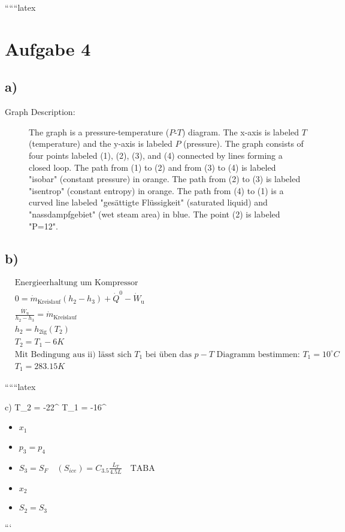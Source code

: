 
``````latex


\section*{Aufgabe 4}

\subsection*{a)}

\begin{description}
    \item[Graph Description:] The graph is a pressure-temperature ($P$-$T$) diagram. The x-axis is labeled $T$ (temperature) and the y-axis is labeled $P$ (pressure). The graph consists of four points labeled (1), (2), (3), and (4) connected by lines forming a closed loop. The path from (1) to (2) and from (3) to (4) is labeled "isobar" (constant pressure) in orange. The path from (2) to (3) is labeled "isentrop" (constant entropy) in orange. The path from (4) to (1) is a curved line labeled "gesättigte Flüssigkeit" (saturated liquid) and "nassdampfgebiet" (wet steam area) in blue. The point (2) is labeled "P=12".
\end{description}

\subsection*{b)}

\begin{align*}
    &\text{Energieerhaltung um Kompressor} \\
    &0 = \dot{m}_{\text{Kreislauf}} (h_2 - h_3) + \dot{Q}^0 - \dot{W}_{\text{u}} \\
    &\frac{\dot{W}_{\text{u}}}{h_2 - h_3} = \dot{m}_{\text{Kreislauf}} \\
    &h_2 = h_{\text{2ig}}(T_2) \\
    &T_2 = T_1 - 6K \\
    &\text{Mit Bedingung aus ii) lässt sich } T_1 \text{ bei üben das } p-T \text{ Diagramm bestimmen: } T_1 = 10^\circ C \\
    &T_1 = 283.15 K
\end{align*}

``````latex


c) \quad T_2 = -22^\circ {} \quad \quad T_1 = -16^\circ {}

\begin{itemize}
    \item $x_1$
    \item $p_3 = p_4$
    \item $S_3 = S_F \quad (S_{ice}) = C_{3.5} \frac{L_T}{4.5L} \quad \text{TABA}$
    \item $x_2$
    \item $S_2 = S_3$
\end{itemize}

```